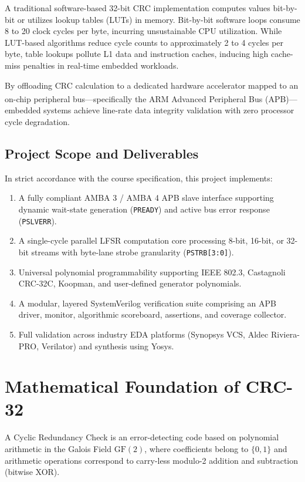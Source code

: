 \documentclass[11pt,a4paper]{article}
\begin{document}
A traditional software-based 32-bit CRC implementation computes values bit-by-bit or utilizes lookup tables (LUTs) in memory. Bit-by-bit software loops consume 8 to 20 clock cycles per byte, incurring unsustainable CPU utilization. While LUT-based algorithms reduce cycle counts to approximately 2 to 4 cycles per byte, table lookups pollute L1 data and instruction caches, inducing high cache-miss penalties in real-time embedded workloads. 

By offloading CRC calculation to a dedicated hardware accelerator mapped to an on-chip peripheral bus---specifically the ARM\textsuperscript{\textregistered} Advanced Peripheral Bus (APB)---embedded systems achieve line-rate data integrity validation with zero processor cycle degradation.

\subsection{Project Scope and Deliverables}
In strict accordance with the course specification, this project implements:
\begin{enumerate}
    \item A fully compliant AMBA 3 / AMBA 4 APB slave interface supporting dynamic wait-state generation (\texttt{PREADY}) and active bus error response (\texttt{PSLVERR}).
    \item A single-cycle parallel LFSR computation core processing 8-bit, 16-bit, or 32-bit streams with byte-lane strobe granularity (\texttt{PSTRB[3:0]}).
    \item Universal polynomial programmability supporting IEEE 802.3, Castagnoli CRC-32C, Koopman, and user-defined generator polynomials.
    \item A modular, layered SystemVerilog verification suite comprising an APB driver, monitor, algorithmic scoreboard, assertions, and coverage collector.
    \item Full validation across industry EDA platforms (Synopsys VCS, Aldec Riviera-PRO, Verilator) and synthesis using Yosys.
\end{enumerate}

\section{Mathematical Foundation of CRC-32}

A Cyclic Redundancy Check is an error-detecting code based on polynomial arithmetic in the Galois Field $\text{GF}(2)$, where coefficients belong to $\{0, 1\}$ and arithmetic operations correspond to carry-less modulo-2 addition and subtraction (bitwise XOR).
\end{document}
